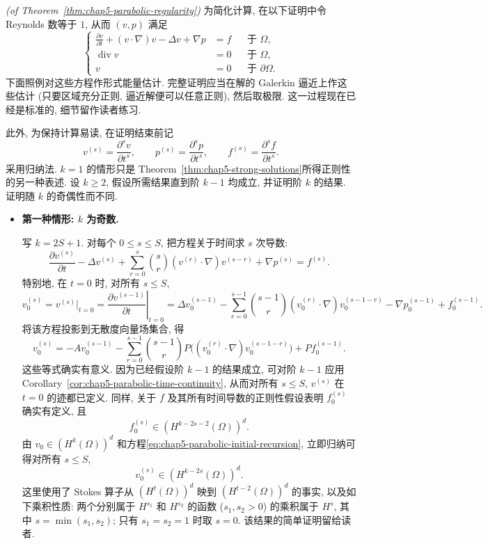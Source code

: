 \begin{Proof}
\textit{(of Theorem~\ref{thm:chap5-parabolic-regularity})}\quad
为简化计算, 在以下证明中令 Reynolds 数等于 $1$, 从而 $(v,p)$ 满足
\[
 \left\{
 \begin{aligned}
 \frac{\partial v}{\partial t}+(v\cdot\nabla)v-\Delta v+\nabla p&=f&&\text{于 }\Omega,\\
 \operatorname{div}v&=0&&\text{于 }\Omega,\\
 v&=0&&\text{于 }\partial\Omega.
 \end{aligned}
 \right.
\]
下面照例对这些方程作形式能量估计. 完整证明应当在解的 Galerkin 逼近上作这些估计 (只要区域充分正则, 逼近解便可以任意正则), 然后取极限. 这一过程现在已经是标准的, 细节留作读者练习.

此外, 为保持计算易读, 在证明结束前记
\[
 v^{(s)}=\frac{\partial^sv}{\partial t^s},
 \qquad p^{(s)}=\frac{\partial^sp}{\partial t^s},
 \qquad f^{(s)}=\frac{\partial^sf}{\partial t^s}.
\]
采用归纳法. $k=1$ 的情形只是 Theorem~\ref{thm:chap5-strong-solutions}所得正则性的另一种表述. 设 $k\geq2$, 假设所需结果直到阶 $k-1$ 均成立, 并证明阶 $k$ 的结果. 证明随 $k$ 的奇偶性而不同.

\begin{itemize}
 \item \textbf{第一种情形: $k$ 为奇数.}

 写 $k=2S+1$. 对每个 $0\leq s\leq S$, 把方程关于时间求 $s$ 次导数:
 \begin{equation}
 \frac{\partial v^{(s)}}{\partial t}-\Delta v^{(s)}
 +\sum_{r=0}^s\binom sr(v^{(r)}\cdot\nabla)v^{(s-r)}
 +\nabla p^{(s)}=f^{(s)}.
 \label{eq:chap5-parabolic-differentiated-equation}
 \end{equation}
 特别地, 在 $t=0$ 时, 对所有 $s\leq S$,
 \[
 v_0^{(s)}=v^{(s)}|_{t=0}
 =\left.\frac{\partial v^{(s-1)}}{\partial t}\right|_{t=0}
 =\Delta v_0^{(s-1)}
 -\sum_{r=0}^{s-1}\binom{s-1}r(v_0^{(r)}\cdot\nabla)v_0^{(s-1-r)}
 -\nabla p_0^{(s-1)}+f_0^{(s-1)}.
 \]
 将该方程投影到无散度向量场集合, 得
 \begin{equation}
 v_0^{(s)}=-Av_0^{(s-1)}
 -\sum_{r=0}^{s-1}\binom{s-1}rP\bigl((v_0^{(r)}\cdot\nabla)v_0^{(s-1-r)}\bigr)
 +Pf_0^{(s-1)}.
 \label{eq:chap5-parabolic-initial-recursion}
 \end{equation}
 这些等式确实有意义. 因为已经假设阶 $k-1$ 的结果成立, 可对阶 $k-1$ 应用 Corollary~\ref{cor:chap5-parabolic-time-continuity}, 从而对所有 $s\leq S$, $v^{(s)}$ 在 $t=0$ 的迹都已定义. 同样, 关于 $f$ 及其所有时间导数的正则性假设表明 $f_0^{(s)}$ 确实有定义, 且
 \[
 f_0^{(s)}\in(H^{k-2s-2}(\Omega))^d.
 \]
 由 $v_0\in(H^k(\Omega))^d$ 和方程\eqref{eq:chap5-parabolic-initial-recursion}, 立即归纳可得对所有 $s\leq S$,
 \begin{equation}
 v_0^{(s)}\in(H^{k-2s}(\Omega))^d.
 \label{eq:chap5-parabolic-initial-regularity}
 \end{equation}
 这里使用了 Stokes 算子从 $(H^t(\Omega))^d$ 映到 $(H^{t-2}(\Omega))^d$ 的事实, 以及如下乘积性质: 两个分别属于 $H^{s_1}$ 和 $H^{s_2}$ 的函数 ($s_1,s_2>0$) 的乘积属于 $H^s$, 其中 $s=\min(s_1,s_2)$; 只有 $s_1=s_2=1$ 时取 $s=0$. 该结果的简单证明留给读者.


\end{itemize}
\end{Proof}
